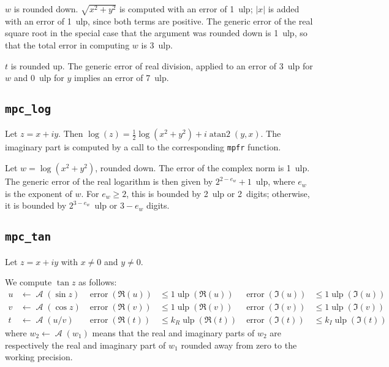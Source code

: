 \documentclass {article}
\newcommand {\mpfr}{{\tt mpfr}}
\newcommand {\ulp}[1]{#1~ulp}
\newcommand {\Ulp}{{\operatorname {ulp}}}
\newcommand {\atantwo}{\operatorname {atan2}}
\newcommand{\error}{\operatorname {error}}
\DeclareMathOperator{\A}{\mathcal A}
\renewcommand {\leq}{\leqslant}
\renewcommand {\geq}{\geqslant}
\begin{document}
$w$ is rounded down. $\sqrt {x^2 + y^2}$ is computed with an error of \ulp{1}; $|x|$ is added with an error of \ulp{1}, since both terms are positive. The generic error of the real square root in the special case that the argument was rounded down is \ulp{1}, so that the total error in computing $w$ is \ulp{3}.

$t$ is rounded up. The generic error of real division, applied to an error of \ulp{3} for $w$ and \ulp{0} for $y$ implies an error of \ulp{7}.


\subsection {\texttt {mpc\_log}}

Let $z = x + i y$. Then $\log (z) = \frac {1}{2} \log (x^2 + y^2) + i \atantwo (y, x)$. The imaginary part is computed by a call to the corresponding {\mpfr} function.

Let $w = \log (x^2 + y^2)$, rounded down. The error of the complex norm is \ulp{1}. The generic error of the real logarithm is then given by \ulp{$2^{2 - e_w} + 1$}, where $e_w$ is the exponent of $w$. For $e_w \geq 2$, this is bounded by \ulp{2} or 2~digits; otherwise, it is bounded by \ulp{$2^{3 - e_w}$} or $3 - e_w$ digits.

\subsection {\texttt {mpc\_tan}}

Let $z = x + i y$ with $x \neq 0$ and $y \neq 0$.

We compute $\tan z$ as follows:
\begin{align*}
u &\leftarrow \A(\sin z) &\error(\Re(u)) &\leq 1 \Ulp(\Re(u))
&\error(\Im(u)) &\leq 1 \Ulp(\Im(u))
\\
v &\leftarrow \A(\cos z) &\error(\Re(v)) &\leq 1 \Ulp(\Re(v))
&\error(\Im(v)) &\leq 1 \Ulp(\Im(v))
\\
t &\leftarrow \A(u/v) &\error(\Re(t)) &\leq k_R \Ulp(\Re(t))
&\error(\Im(t)) &\leq k_I \Ulp(\Im(t))
\end{align*}
where $w_2 \leftarrow \A(w_1)$ means that the real and imaginary parts of
$w_2$ are respectively the real and imaginary part of $w_1$ rounded away from
zero to the working precision.
\end{document}
